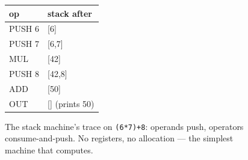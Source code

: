 \begin{figure}[htbp]
\centering
\begin{tabular}{ll}
\toprule
op & stack after \\
\midrule
PUSH 6 & [6] \\
PUSH 7 & [6,7] \\
MUL & [42] \\
PUSH 8 & [42,8] \\
ADD & [50] \\
OUT & [] (prints 50) \\
\bottomrule
\end{tabular}
\caption{The stack machine's trace on \texttt{(6*7)+8}: operands
push, operators consume-and-push. No registers, no allocation ---
the simplest machine that computes.}
\label{fig:stack18}
\end{figure}
